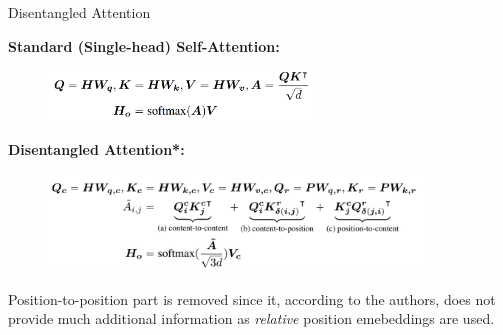 
\begin{frame}{Disentangled Attention}

\vfill

	\textbf{Standard (Single-head) Self-Attention:}

	\begin{figure}
		\centering
		\includegraphics[width = 7cm]{figure/deberta-single.png}
	\end{figure}
	
	\textbf{Disentangled Attention*:}

	\begin{figure}
		\centering
		\includegraphics[width = 10cm]{figure/deberta-dis.png}
	\end{figure}
	

{\footnotesize *Position-to-position part is removed since it, according to the authors, does not provide much additional information as \textit{relative} position emebeddings are used.}

\vfill

\end{frame}


\endlecture

